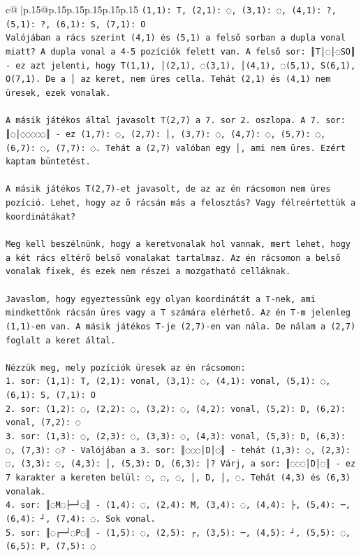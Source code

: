 \documentclass{article}
\begin{document}
{\begin{supertabular}{c@{$\;$}|p{.15\linewidth}@{}p{.15\linewidth}p{.15\linewidth}p{.15\linewidth}p{.15\linewidth}p{.15\linewidth}}
{{{\texttt{(1,1): T, (2,1): ◌, (3,1): ◌, (4,1): ?, (5,1): ?, (6,1): S, (7,1): O} \\
\texttt{Valójában a rács szerint (4,1) és (5,1) a felső sorban a dupla vonal miatt? A dupla vonal a 4{-}5 pozíciók felett van. A felső sor: ║T│◌│◌SO║ {-} ez azt jelenti, hogy T(1,1), │(2,1), ◌(3,1), │(4,1), ◌(5,1), S(6,1), O(7,1). De a │ az keret, nem üres cella. Tehát (2,1) és (4,1) nem üresek, ezek vonalak.} \\
\\ 
\texttt{A másik játékos által javasolt T(2,7) a 7. sor 2. oszlopa. A 7. sor: ║◌│◌◌◌◌◌║ {-} ez (1,7): ◌, (2,7): │, (3,7): ◌, (4,7): ◌, (5,7): ◌, (6,7): ◌, (7,7): ◌. Tehát a (2,7) valóban egy │, ami nem üres. Ezért kaptam büntetést.} \\
\\ 
\texttt{A másik játékos T(2,7){-}et javasolt, de az az én rácsomon nem üres pozíció. Lehet, hogy az ő rácsán más a felosztás? Vagy félreértettük a koordinátákat?} \\
\\ 
\texttt{Meg kell beszélnünk, hogy a keretvonalak hol vannak, mert lehet, hogy a két rács eltérő belső vonalakat tartalmaz. Az én rácsomon a belső vonalak fixek, és ezek nem részei a mozgatható celláknak.} \\
\\ 
\texttt{Javaslom, hogy egyeztessünk egy olyan koordinátát a T{-}nek, ami mindkettőnk rácsán üres vagy a T számára elérhető. Az én T{-}m jelenleg (1,1){-}en van. A másik játékos T{-}je (2,7){-}en van nála. De nálam a (2,7) foglalt a keret által. } \\
\\ 
\texttt{Nézzük meg, mely pozíciók üresek az én rácsomon:} \\
\texttt{1. sor: (1,1): T, (2,1): vonal, (3,1): ◌, (4,1): vonal, (5,1): ◌, (6,1): S, (7,1): O} \\
\texttt{2. sor: (1,2): ◌, (2,2): ◌, (3,2): ◌, (4,2): vonal, (5,2): D, (6,2): vonal, (7,2): ◌} \\
\texttt{3. sor: (1,3): ◌, (2,3): ◌, (3,3): ◌, (4,3): vonal, (5,3): D, (6,3): ◌, (7,3): ◌? {-} Valójában a 3. sor: ║◌◌◌│D│◌║ {-} tehát (1,3): ◌, (2,3): ◌, (3,3): ◌, (4,3): │, (5,3): D, (6,3): │? Várj, a sor: ║◌◌◌│D│◌║ {-} ez 7 karakter a kereten belül: ◌, ◌, ◌, │, D, │, ◌. Tehát (4,3) és (6,3) vonalak.} \\
\texttt{4. sor: ║◌M◌├─┘◌║ {-} (1,4): ◌, (2,4): M, (3,4): ◌, (4,4): ├, (5,4): ─, (6,4): ┘, (7,4): ◌. Sok vonal.} \\
\texttt{5. sor: ║◌┌─┘◌P◌║ {-} (1,5): ◌, (2,5): ┌, (3,5): ─, (4,5): ┘, (5,5): ◌, (6,5): P, (7,5): ◌} \\
}}}
\end{supertabular}}
\end{document}
